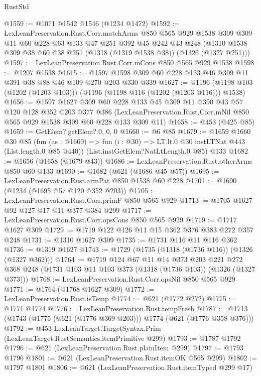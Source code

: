 \begin{lexlean}{RustStd}
\begin{coremodule}
@1559 := @1071 @1542 @1546 (@1234 @1472)
@1592 := LexLeanPreservation.Rust.Corr.matchArms
    @850
    @565
    @929
    @1538
    @309
    @309
    @11
    @60
    @228
    @63
    @133
    @47
    @251
    @392
    @45
    @242
    @43
    @248
    (@1310 @1538 @309 @38 @60 @38 @251 (@1318 (@1319 @1538 @38)) (@1326 (@1327 @251)))
@1597 := LexLeanPreservation.Rust.Corr.mCons @850 @565 @929 @1538
@1598 := @1207 @1538
@1615 := @1597 @1598 @309 @60 @228 @133 @46 @309 @11 @391 @38 @88 @46 @109 @270 @203 @330 @339
@1627 := @1196 (@1198 @103 (@1202 (@1203 @103))) (@1196 (@1198 @116 (@1202 (@1203 @116))) @1538)
@1656 := @1597
    @1627
    @309
    @60
    @228
    @133
    @45
    @309
    @11
    @390
    @43
    @57
    @120
    @128
    @352
    @203
    @377
    @386
    (LexLeanPreservation.Rust.Corr.mNil @850 @565 @929 @1538 @309 @60 @228 @133 @309 @11)
@1658 := @453 (@425 @85)
@1659 := GetElem?.getElem?.{0, 0, 0}
@1660 := @6 @85
@1679 := @1659
    @1660
    @30
    @85
    (fun (as : @1660) => fun (i : @30) => LT.lt.{0} @30 instLTNat @443 (List.length.{0} @85 @440))
    (List.instGetElem?NatLtLength.{0} @85)
    @133
@1682 := @1656 (@1658 (@1679 @43))
@1686 := LexLeanPreservation.Rust.otherArms @850 @60 @133
@1690 := @1682 (@621 (@1686 @45 @57))
@1695 := LexLeanPreservation.Rust.armPat @850 @1538 @60 @228
@1701 := @1690 (@1234 (@1695 @57 @120 @352 @203))
@1705 := LexLeanPreservation.Rust.Corr.primF @850 @565 @929
@1713 := @1705 @1627 @92 @127 @17 @11 @377 @384 @299
@1717 := LexLeanPreservation.Rust.Corr.opsCons @850 @565 @929
@1719 := @1717 @1627 @309
@1729 := @1719 @122 @126 @11 @15 @362 @376 @383 @272 @357 @248
@1731 := @1310 @1627 @309
@1735 := @1731 @116 @11 @116 @362
@1736 := @1319 @1627
@1743 := @1729 (@1735 (@1318 (@1736 @116)) (@1326 (@1327 @362)))
@1764 := @1719
    @124
    @67
    @11
    @14
    @373
    @203
    @221
    @272
    @368
    @248
    (@1731 @103 @11 @103 @373 (@1318 (@1736 @103)) (@1326 (@1327 @373)))
@1768 := LexLeanPreservation.Rust.Corr.opsNil @850 @565 @929
@1771 := @1764 (@1768 @1627 @309)
@1772 := LexLeanPreservation.Rust.isTemp
@1774 := @621 (@1772 @272)
@1775 := @1771 @1774
@1776 := LexLeanPreservation.Rust.tempFresh
@1787 := @1713 (@1743 (@1775 (@621 (@1776 @369 @203))) @1774 (@621 (@1776 @358 @376)))
@1792 := @453 LexLeanTarget.TargetSyntax.Prim (LexLeanTarget.RustSemantics.itemPrimitive @299)
@1793 := @1787 @1792
@1796 := @621 (LexLeanPreservation.Rust.plainItem @299)
@1797 := @1793 @1796
@1801 := @621 (LexLeanPreservation.Rust.itemOK @565 @299)
@1802 := @1797 @1801
@1806 := @621 (LexLeanPreservation.Rust.itemTyped @299 @17)

\end{coremodule}
\end{lexlean}
